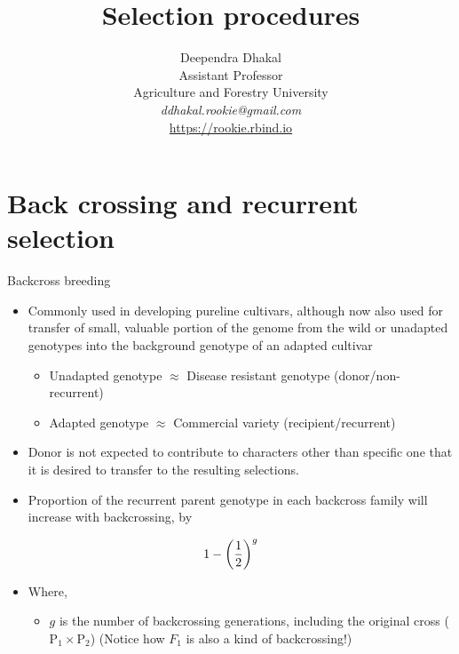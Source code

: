 \documentclass[11pt,dvipsnames,ignorenonframetext,aspectratio=169]{beamer}
\title[]{Selection procedures}
\author[
        \vspace{-0.5cm}Deependra Dhakal\\
Assistant Professor\\
Agriculture and Forestry University\\
\textit{ddhakal.rookie@gmail.com}\\
\url{https://rookie.rbind.io}
    ]{\vspace{-0.5cm}Deependra Dhakal\\
Assistant Professor\\
Agriculture and Forestry University\\
\textit{ddhakal.rookie@gmail.com}\\
\url{https://rookie.rbind.io}}
\date[
      
  ]{
    }
\providecommand{\tightlist}{%
  \setlength{\itemsep}{0pt}\setlength{\parskip}{0pt}}
\begin{document}
  \begin{frame}[plain]
  \titlepage
  \end{frame}



\hypertarget{back-crossing-and-recurrent-selection}{%
\section{Back crossing and recurrent
selection}\label{back-crossing-and-recurrent-selection}}

\begin{frame}{Backcross breeding}
\protect\hypertarget{backcross-breeding}{}
\small

\begin{itemize}
\tightlist
\item
  Commonly used in developing pureline cultivars, although now also used
  for transfer of small, valuable portion of the genome from the wild or
  unadapted genotypes into the background genotype of an adapted
  cultivar

  \begin{itemize}
  \tightlist
  \item
    Unadapted genotype \(\approx\) Disease resistant genotype
    (\alert{donor/non-recurrent})
  \item
    Adapted genotype \(\approx\) Commercial variety
    (\alert{recipient/recurrent})
  \end{itemize}
\item
  Donor is not expected to contribute to characters other than specific
  one that it is desired to transfer to the resulting selections.
\item
  Proportion of the recurrent parent genotype in each backcross family
  will increase with backcrossing, by
\end{itemize}

\[
\small
1 - \left(\frac{1}{2}\right)^g
\]

\begin{itemize}
\tightlist
\item
  Where,

  \begin{itemize}
  \tightlist
  \item
    \(g\) is the number of backcrossing generations, including the
    original cross (\(\mathrm{P_1 \times P_2}\)) (Notice how \(F_1\) is
    also a kind of backcrossing!)
  \end{itemize}
\end{itemize}
\end{frame}
\end{document}
